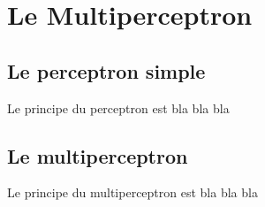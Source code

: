 \chapter{Le Multiperceptron}

\section{Le perceptron simple}
Le principe du perceptron est bla bla bla

\section{Le multiperceptron}
Le principe du multiperceptron est bla bla bla